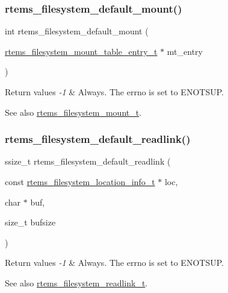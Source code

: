 \subsubsection{\texorpdfstring{rtems\_filesystem\_default\_mount()}{rtems\_filesystem\_default\_mount()}}
{\footnotesize\ttfamily int rtems\+\_\+filesystem\+\_\+default\+\_\+mount (\begin{DoxyParamCaption}\item[{\mbox{\hyperlink{structrtems__filesystem__mount__table__entry__tt}{rtems\+\_\+filesystem\+\_\+mount\+\_\+table\+\_\+entry\+\_\+t}} $\ast$}]{mt\+\_\+entry }\end{DoxyParamCaption})}


\begin{DoxyRetVals}{Return values}
{\em -\/1} & Always. The errno is set to E\+N\+O\+T\+S\+UP.\\
\hline
\end{DoxyRetVals}
\begin{DoxySeeAlso}{See also}
\mbox{\hyperlink{group__LibIOFSOps_ga1836d0f226aaaf7d7a94231dadb42663}{rtems\+\_\+filesystem\+\_\+mount\+\_\+t}}. 
\end{DoxySeeAlso}
\mbox{\label{group__LibIOFSOps_gaebd8dda0956f23082c6d9cb151d3db8c}} 
\subsubsection{\texorpdfstring{rtems\_filesystem\_default\_readlink()}{rtems\_filesystem\_default\_readlink()}}
{\footnotesize\ttfamily ssize\+\_\+t rtems\+\_\+filesystem\+\_\+default\+\_\+readlink (\begin{DoxyParamCaption}\item[{const \mbox{\hyperlink{group__LibIO_ga3252b3d31ee3c49ffff0b7604a676864}{rtems\+\_\+filesystem\+\_\+location\+\_\+info\+\_\+t}} $\ast$}]{loc,  }\item[{char $\ast$}]{buf,  }\item[{size\+\_\+t}]{bufsize }\end{DoxyParamCaption})}


\begin{DoxyRetVals}{Return values}
{\em -\/1} & Always. The errno is set to E\+N\+O\+T\+S\+UP.\\
\hline
\end{DoxyRetVals}
\begin{DoxySeeAlso}{See also}
\mbox{\hyperlink{group__LibIOFSOps_ga811a6b3bc7b01155f7b585a8eae29177}{rtems\+\_\+filesystem\+\_\+readlink\+\_\+t}}. 
\end{DoxySeeAlso}
\mbox{\label{group__LibIOFSOps_ga2338baaf387fcb88acd1ea1abe897bd4}} 
